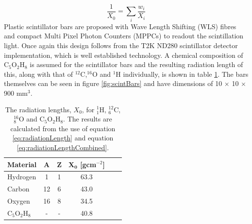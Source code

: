 \begin{equation}
	\frac{1}{X_{0}} = \sum_{i} \frac{w_{i}}{X_{i}}
	\label{eq:radiationLengthCombined}
\end{equation}
Plastic scintillator bars are proposed with Wave Length Shifting (WLS) fibres and compact Multi Pixel Photon Counters (MPPCs) to readout the scintillation light. Once again this design follows from the T2K ND280 scintillator detector implementation, which is well established technology. A chemical composition of C$_{5}$O$_{2}$H$_{8}$ is assumed for the scintillator bars and the resulting radiation length of this, along with that of $^{12}$C,$^{16}$O and $^{1}$H individually, is shown in table \ref{tab:radiationLengths}. The bars themselves can be seen in figure \ref{fig:scintBars} and have dimensions of 10 $\times$ 10 $\times$ 900 mm$^{3}$.

\begin{table}
\begin{center}
  \begin{tabular}{l*{4}{c}r}
  \hline
  \textbf{Material} & \textbf{A} & \textbf{Z} & $\boldsymbol{X_{0}}$ \textbf{[gcm$^{-2}$]} \\
  \hline
  \hline
  Hydrogen & 1 & 1 & 63.3 \\
  Carbon & 12 & 6 & 43.0 \\
  Oxygen & 16 & 8 & 34.5 \\
  C$_{5}$O$_{2}$H$_{8}$ & - & - & 40.8 \\
  \hline
  \end{tabular}
      \caption{The radiation lengths, $X_{0}$, for $^{1}_{1}$H, $^{12}_{6}$C, $^{16}_{8}$O and C$_{5}$O$_{2}$H$_{8}$. The results are calculated from the use of equation \ref{eq:radiationLength} and equation \ref{eq:radiationLengthCombined}.}
    \label{tab:radiationLengths}
\end{center}
    \end{table}

